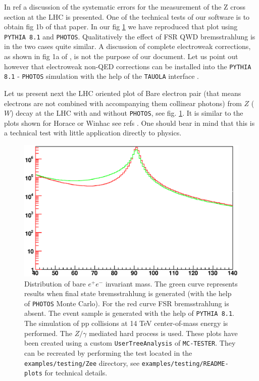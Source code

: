 \documentclass[]{Photos_interface_design}
\begin{document}
In ref \cite{Adam:2008ge} a discussion of the systematic errors for the measurement of the Z cross 
section at the LHC is presented. One of the technical tests of our software is to obtain
fig 1b of that paper. In our fig \ref{fig:lineshape} we have 
reproduced that plot using {\tt PYTHIA 8.1} and {\tt PHOTOS}. Qualitatively the effect
of FSR QWD bremsstrahlung is in the two cases quite similar. A discussion
of complete electroweak corrections, as shown in fig 1a of  \cite{Adam:2008ge},
is not the purpose of our document. Let us point out however that electroweak 
non-QED corrections can be installed into the {\tt PYTHIA 8.1} - {\tt PHOTOS} simulation with 
the help of the {\tt TAUOLA} interface \cite{Davidson:2010rw}.

Let us present next the LHC oriented plot of Bare electron pair (that means electrons are not combined with accompanying them collinear photons) from $Z$
($W$) decay at the LHC with and without {\tt PHOTOS}, see fig. \ref{fig:lineshape}. It is similar to
the plots shown for Horace or Winhac see refs \cite{Horace,Winhac}.
One should bear in mind that this is a technical test with little application directly to physics.
\begin{figure}[h!]
\centering
\includegraphics[scale=0.85]{lineshape.eps}
\caption{Distribution of bare $e^+e^-$ invariant mass. The green curve represents results when final state 
bremsstrahlung is generated (with the help of {\tt PHOTOS} Monte Carlo). For the red curve FSR 
bremsstrahlung is absent. The event sample is generated with the help of {\tt PYTHIA 8.1}.
The simulation of pp collisions at 14 TeV center-of-mass energy is performed.
The $Z/\gamma$ mediated hard process is used.
These plots have been created using a custom {\tt UserTreeAnalysis} of {\tt MC-TESTER}.
They can be recreated by performing the test located in the {\tt examples/testing/Zee} directory, see  {\tt examples/testing/README-plots} for technical details.
\label{fig:lineshape}
}
\end{figure}
\end{document}
